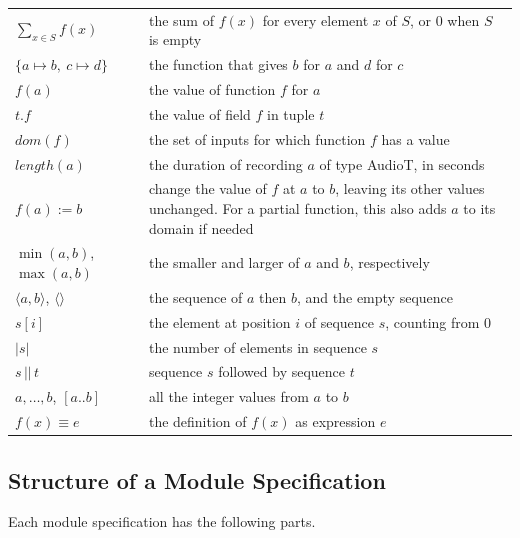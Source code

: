 \documentclass[10pt, titlepage]{article}
\newcommand{\T}[1]{\mathit{#1}}          %
\begin{document}
\begin{center}
\begin{tabular}{p{4.6cm} p{10cm}}
$\sum_{x \in S} f(x)$ & the sum of $f(x)$ for every element $x$ of $S$,
or 0 when $S$ is empty\\
$\{a \mapsto b,\ c \mapsto d\}$ & the function that gives $b$ for $a$ and $d$
for $c$\\
$f(a)$ & the value of function $f$ for $a$\\
$t.f$ & the value of field $f$ in tuple $t$\\
$\T{dom}(f)$ & the set of inputs for which function $f$ has a value\\
$\T{length}(a)$ & the duration of recording $a$ of type AudioT, in seconds\\
$f(a) := b$ & change the value of $f$ at $a$ to $b$, leaving its other values
unchanged. For a partial function, this also adds $a$ to its domain if needed\\
$\min(a,b)$, $\max(a,b)$ & the smaller and larger of $a$ and $b$, respectively\\
$\langle a, b \rangle$, $\langle\rangle$ & the sequence of $a$ then $b$, and
the empty sequence\\
$s[i]$ & the element at position $i$ of sequence $s$, counting from 0\\
$|s|$ & the number of elements in sequence $s$\\
$s \,||\, t$ & sequence $s$ followed by sequence $t$\\
$a, \ldots, b$, $[a..b]$ & all the integer values from $a$ to $b$\\
$f(x) \equiv e$ & the definition of $f(x)$ as expression $e$\\
\bottomrule
\end{tabular}
\end{center}

\subsection{Structure of a Module Specification}

Each module specification has the following parts.
\end{document}
